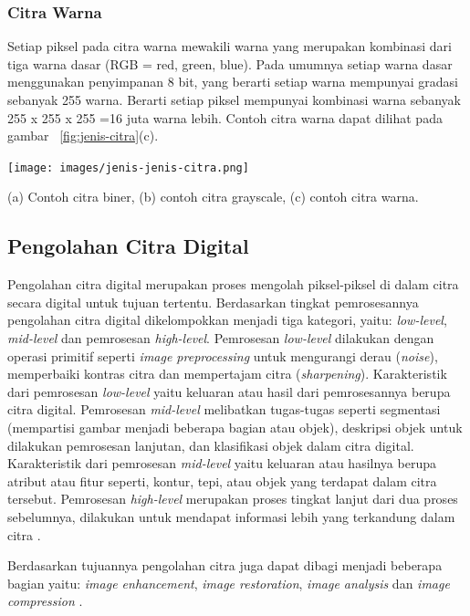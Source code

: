 \subsubsection{Citra Warna} 
Setiap piksel pada citra warna mewakili warna yang merupakan kombinasi dari tiga warna dasar (RGB = red, green, blue). Pada umumnya setiap warna dasar menggunakan penyimpanan 8 bit, yang berarti setiap warna mempunyai gradasi sebanyak 255 warna. Berarti setiap piksel mempunyai kombinasi warna sebanyak 255 x 255 x 255 =16 juta warna lebih. Contoh citra warna dapat dilihat pada gambar ~\ref{fig:jenis-citra}(c).

\begin{afigure}
    \texttt{[image: images/jenis-jenis-citra.png]}
    \caption{(a) Contoh citra biner, (b) contoh citra grayscale, (c) contoh citra warna.}
    \label{fig:jenis-citra}
\end{afigure}


\subsection{Pengolahan Citra Digital}
Pengolahan citra digital merupakan proses mengolah piksel-piksel di dalam citra secara digital untuk tujuan tertentu. Berdasarkan tingkat pemrosesannya pengolahan citra digital dikelompokkan menjadi tiga kategori, yaitu: \textit{low-level}, \textit{mid-level} dan pemrosesan \textit{high-level}. Pemrosesan \textit{low-level} dilakukan dengan operasi primitif seperti \textit{image preprocessing} untuk mengurangi derau (\textit{noise}), memperbaiki kontras citra dan mempertajam citra (\textit{sharpening}). Karakteristik dari pemrosesan \textit{low-level} yaitu keluaran atau hasil dari pemrosesannya berupa citra digital. Pemrosesan \textit{mid-level} melibatkan tugas-tugas seperti segmentasi (mempartisi gambar menjadi beberapa bagian atau objek), deskripsi objek untuk dilakukan pemrosesan lanjutan, dan klasifikasi objek dalam citra digital. Karakteristik dari pemrosesan \textit{mid-level} yaitu keluaran atau hasilnya berupa atribut atau fitur seperti, kontur, tepi, atau objek yang terdapat dalam citra tersebut. Pemrosesan \textit{high-level} merupakan proses tingkat lanjut dari dua proses sebelumnya, dilakukan untuk mendapat informasi lebih yang terkandung dalam citra \cite{book:gonzalez}.

Berdasarkan tujuannya pengolahan citra juga dapat dibagi menjadi beberapa bagian yaitu: \textit{image enhancement}, \textit{image restoration}, \textit{image analysis} dan \textit{image compression} \cite{book:dasilva}.

